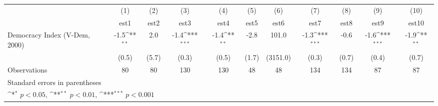 {
\def\sym#1{\ifmmode^{#1}\else\(^{#1}\)\fi}
\begin{tabular}{l*{10}{c}}
\hline\hline
                    &\multicolumn{1}{c}{(1)}         &\multicolumn{1}{c}{(2)}         &\multicolumn{1}{c}{(3)}         &\multicolumn{1}{c}{(4)}         &\multicolumn{1}{c}{(5)}         &\multicolumn{1}{c}{(6)}         &\multicolumn{1}{c}{(7)}         &\multicolumn{1}{c}{(8)}         &\multicolumn{1}{c}{(9)}         &\multicolumn{1}{c}{(10)}         \\
                    &        est1         &        est2         &        est3         &        est4         &        est5         &        est6         &        est7         &        est8         &        est9         &       est10         \\
\hline
Democracy Index (V-Dem, 2000)&        -1.5\sym{**} &         2.0         &        -1.4\sym{***}&        -1.4\sym{**} &        -2.8         &       101.0         &        -1.3\sym{***}&        -0.6         &        -1.6\sym{***}&        -1.9\sym{**} \\
                    &       (0.5)         &       (5.7)         &       (0.3)         &       (0.5)         &       (1.7)         &    (3151.0)         &       (0.3)         &       (0.7)         &       (0.4)         &       (0.7)         \\
\hline
Observations        &          80         &          80         &         130         &         130         &          48         &          48         &         134         &         134         &          87         &          87         \\
\hline\hline
\multicolumn{11}{l}{\footnotesize Standard errors in parentheses}\\
\multicolumn{11}{l}{\footnotesize \sym{*} \(p<0.05\), \sym{**} \(p<0.01\), \sym{***} \(p<0.001\)}\\
\end{tabular}
}
